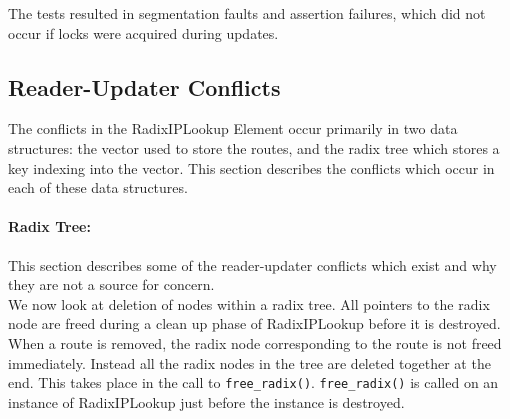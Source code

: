 \documentclass[a4paper,marginparwidth=50pt,marginparsep=10pt]{article}
\begin{document}
The tests resulted in segmentation faults and assertion failures, which did not occur if locks were acquired during updates.
\subsection{Reader-Updater Conflicts}
The conflicts in the RadixIPLookup Element occur primarily in two data structures: the vector used to store the routes, and the radix tree which stores a key indexing into the vector. This section describes the conflicts which occur in each of these data structures.
\paragraph{Radix Tree:}
This section describes some of the reader-updater conflicts which exist and why they are not a source for concern.\\

We now look at deletion of nodes within a radix tree. All pointers to the radix node are freed during a clean up phase of RadixIPLookup before it is destroyed. When a route is removed, the radix node corresponding to the route is not freed immediately. Instead all the radix nodes in the tree are deleted together at the end. This takes place in the call to \verb+free_radix()+. \verb+free_radix()+ is called on an instance of RadixIPLookup just before the instance is destroyed.\\
\end{document}
